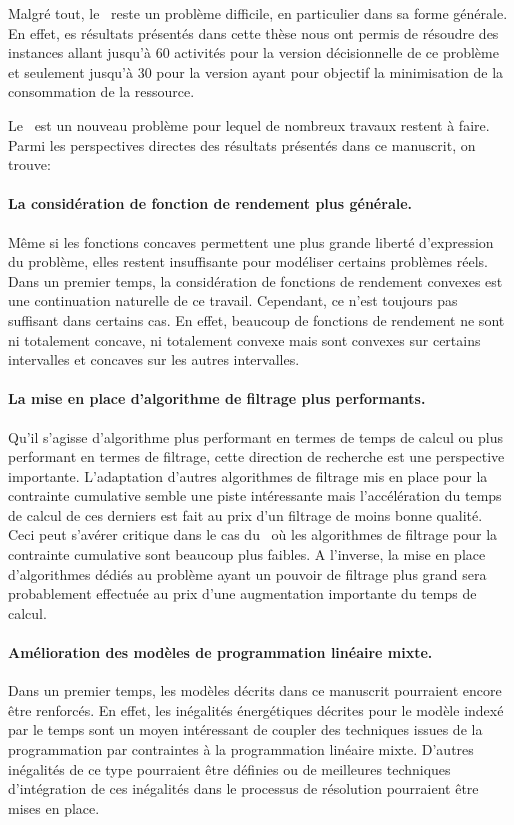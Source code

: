Malgré tout, le \CECSP~reste un problème difficile, en particulier
dans sa forme générale. En effet, es résultats présentés dans cette
thèse nous ont permis de résoudre des instances allant jusqu'à $60$
activités pour la version décisionnelle de ce problème et seulement
jusqu'à $30$ pour la version ayant pour objectif la minimisation de la
consommation de la ressource. 

Le \CECSP~est un nouveau problème pour lequel de nombreux travaux
restent à faire. Parmi les perspectives directes des résultats
présentés dans ce manuscrit, on trouve:
\paragraph{La considération de fonction de rendement plus générale.} Même si les fonctions concaves permettent une plus grande
  liberté d'expression du problème, elles restent insuffisante pour
  modéliser certains problèmes réels. Dans un premier temps, la
  considération de fonctions de rendement convexes est une
  continuation naturelle de ce travail. Cependant, ce n'est toujours
  pas suffisant dans certains cas. En effet, beaucoup de fonctions 
  de rendement ne sont ni totalement concave, ni totalement convexe
  mais sont convexes sur certains intervalles et concaves sur les
  autres intervalles. 

\paragraph{La mise en place d'algorithme de filtrage plus
  performants.} Qu'il s'agisse d'algorithme plus performant en termes
de temps de calcul ou plus performant en termes de filtrage, cette
direction de recherche est une perspective importante. L'adaptation
d'autres algorithmes de filtrage mis en place pour la contrainte
cumulative semble une piste intéressante mais l'accélération du temps
de calcul de ces derniers est fait au prix d'un filtrage de moins
bonne qualité. Ceci peut s'avérer critique dans le cas du \CECSP~où
les algorithmes de filtrage pour la contrainte cumulative sont
beaucoup plus faibles. A l'inverse, la mise en place d'algorithmes
dédiés au problème ayant un pouvoir de filtrage plus grand sera
probablement effectuée au prix d'une augmentation importante du temps 
de calcul. 

\paragraph{Amélioration des modèles de programmation linéaire mixte.}
Dans un premier temps, les modèles décrits dans ce manuscrit
pourraient encore être renforcés. En effet, les inégalités
énergétiques décrites pour le modèle indexé par le temps sont un moyen
intéressant de coupler des techniques issues de la programmation par
contraintes à la programmation linéaire mixte. D'autres inégalités de
ce type pourraient être définies ou de meilleures techniques
d'intégration de ces inégalités dans le processus de résolution
pourraient être mises en place. 

